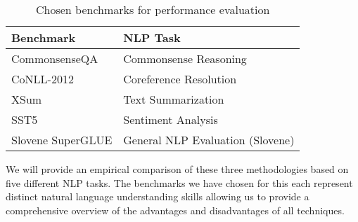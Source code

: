 \begin{table}[htbp]
  \centering
  \begin{tabularx}{\columnwidth}{lX}
    \toprule
    \textbf{Benchmark} & \textbf{NLP Task} \\
    \midrule
    CommonsenseQA \cite{talmor2019commonsenseqa} & Commonsense Reasoning \\
    CoNLL-2012 \cite{pradhan2012conll} & Coreference Resolution \\
    XSum \cite{narayan2018xsum} & Text Summarization \\
    SST5 \cite{maas2011sentiment} & Sentiment Analysis \\
    Slovene SuperGLUE \cite{robnik2022superglue} & General NLP Evaluation (Slovene) \\
    \bottomrule
  \end{tabularx}
  \caption{Chosen benchmarks for performance evaluation}
  \label{tab:benchmarks}
\end{table}
We will provide an empirical comparison of these three methodologies based on five different NLP tasks. The benchmarks we have chosen for this each represent distinct natural language understanding skills allowing us to provide a comprehensive overview of the advantages and disadvantages of all techniques.